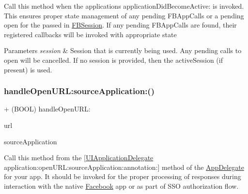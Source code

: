 Call this method when the application\textquotesingle{}s application\+Did\+Become\+Active\+: is invoked. This ensures proper state management of any pending F\+B\+App\+Calls or a pending open for the passed in \hyperlink{interfaceFBSession}{F\+B\+Session}. If any pending F\+B\+App\+Calls are found, their registered callbacks will be invoked with appropriate state


\begin{DoxyParams}{Parameters}
{\em session} & Session that is currently being used. Any pending calls to open will be cancelled. If no session is provided, then the active\+Session (if present) is used. \\
\hline
\end{DoxyParams}
\mbox{\label{interfaceFBAppCall_a199dea04bcd5f045d222a0c98901a3b9}} 
\subsubsection{\texorpdfstring{handle\+Open\+U\+R\+L\+:source\+Application\+:()}{handleOpenURL:sourceApplication:()}\hspace{0.1cm}{\footnotesize\ttfamily [1/5]}}
{\footnotesize\ttfamily + (B\+O\+OL) handle\+Open\+U\+R\+L\+: \begin{DoxyParamCaption}\item[{(N\+S\+U\+RL $\ast$)}]{url }\item[{sourceApplication:(N\+S\+String $\ast$)}]{source\+Application }\end{DoxyParamCaption}}

Call this method from the \mbox{[}\hyperlink{classUIApplicationDelegate-p}{U\+I\+Application\+Delegate} application\+:open\+U\+R\+L\+:source\+Application\+:annotation\+:\mbox{]} method of the \hyperlink{classAppDelegate}{App\+Delegate} for your app. It should be invoked for the proper processing of responses during interaction with the native \hyperlink{interfaceFacebook}{Facebook} app or as part of S\+SO authorization flow.


